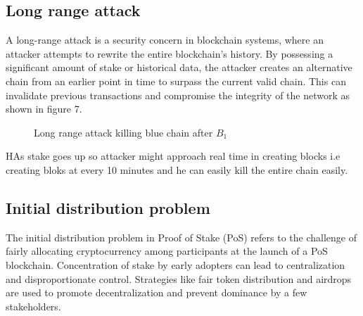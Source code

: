 \documentclass{article}
\begin{document}
\subsection{Long range attack}
A long-range attack is a security concern in blockchain systems, where an attacker attempts to rewrite the entire blockchain's history. By possessing a significant amount of stake or historical data, the attacker creates an alternative chain from an earlier point in time to surpass the current valid chain. This can invalidate previous transactions and compromise the integrity of the network as shown in figure 7.
\begin{figure}
\centering
  \caption{Long range attack killing blue chain after $B_1$}
\end{figure}
HAs stake goes up so attacker might approach real time in creating blocks i.e creating bloks at every 10 minutes and he can easily kill the entire chain easily.
\subsection{Initial distribution problem}
The initial distribution problem in Proof of Stake (PoS) refers to the challenge of fairly allocating cryptocurrency among participants at the launch of a PoS blockchain. Concentration of stake by early adopters can lead to centralization and disproportionate control. Strategies like fair token distribution and airdrops are used to promote decentralization and prevent dominance by a few stakeholders.
\end{document}
